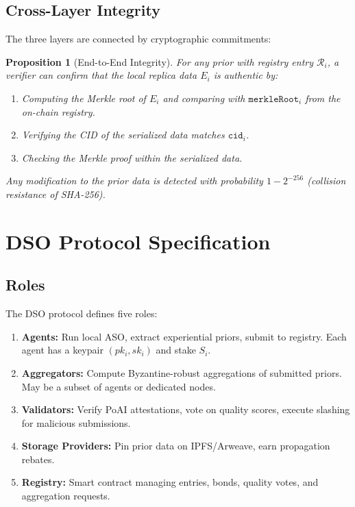 \documentclass[11pt]{article}
\newtheorem{proposition}[theorem]{Proposition}
\begin{document}
\subsection{Cross-Layer Integrity}

The three layers are connected by cryptographic commitments:

\begin{proposition}[End-to-End Integrity]
For any prior with registry entry $\mathcal{R}_i$, a verifier can confirm that
the local replica data $E_i$ is authentic by:
\begin{enumerate}[leftmargin=1.5em]
    \item Computing the Merkle root of $E_i$ and comparing with
          $\texttt{merkleRoot}_i$ from the on-chain registry.
    \item Verifying the CID of the serialized data matches $\texttt{cid}_i$.
    \item Checking the Merkle proof within the serialized data.
\end{enumerate}
Any modification to the prior data is detected with probability
$1 - 2^{-256}$ (collision resistance of SHA-256).
\end{proposition}

\section{DSO Protocol Specification}
\label{sec:protocol}

\subsection{Roles}

The DSO protocol defines five roles:

\begin{enumerate}[leftmargin=1.5em]
    \item \textbf{Agents:} Run local ASO, extract experiential priors, submit
          to registry. Each agent has a keypair $(pk_i, sk_i)$ and stake $S_i$.
    \item \textbf{Aggregators:} Compute Byzantine-robust aggregations of
          submitted priors. May be a subset of agents or dedicated nodes.
    \item \textbf{Validators:} Verify PoAI attestations, vote on quality scores,
          execute slashing for malicious submissions.
    \item \textbf{Storage Providers:} Pin prior data on IPFS/Arweave, earn
          propagation rebates.
    \item \textbf{Registry:} Smart contract managing entries, bonds, quality
          votes, and aggregation requests.
\end{enumerate}
\end{document}
